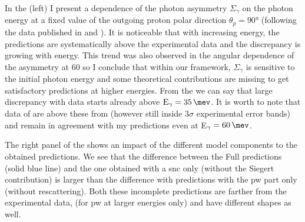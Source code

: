      In the  (left) I present a dependence of the photon asymmetry
     $\Sigma_\gamma$ on the photon energy at a fixed value
     of the outgoing proton polar direction $\theta_p = \ang{90}$ 
     (following the data published in \cite{delbianco_1981} and \cite{depascale_asymmetry}).
     It is noticeable that with increasing energy, the predictions
     are systematically above the experimental data and the discrepancy is growing with energy.
     This trend
     was also observed in the angular dependence of the asymmetry at \SI{60}{\mev}
     so I conclude that within our framework, 
     $\Sigma_\gamma$ is sensitive to the initial photon energy and some theoretical
     contributions are missing to get satisfactory predictions
     at higher energies. From the  we can say that
     large discrepancy with data starts already above $\text{E}_\gamma = \SI{35}{\mev}$.
     It is worth to note that data of \cite{depascale_asymmetry} are
     above these from \cite{delbianco_1981} (however still inside $3\sigma$ experimental
     error bands) and remain in agreement with my predictions even at E$_\gamma=\SI{60}{\mev}$.

    The right panel of the  shows an impact of the
    different model components to the obtained predictions.
    We see that the difference between the Full predictions (solid blue line)
    and the one obtained with a \gls{snc} only (without the Siegert contribution)
    is larger than the difference with predictions with the \gls{pw} part only (without rescattering).
    Both these incomplete predictions are farther from the experimental data,
    (for \gls{pw} at larger energies only) and have different shapes as well. 

